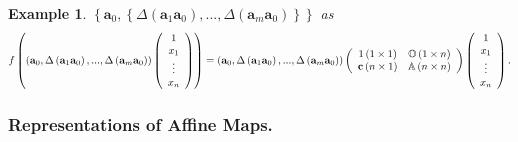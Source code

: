 \documentclass[aps,preprint]{revtex4}%
\newtheorem{example}[theorem]{Example}
\begin{document}
\begin{example}
$\left\{  \mathbf{a}_{0},\left\{  \Delta\left(  \mathbf{a}_{1}\mathbf{a}%
_{0}\right)  ,...,\Delta\left(  \mathbf{a}_{m}\mathbf{a}_{0}\right)  \right\}
\right\}  $ as
\begin{equation}
f\left(  \left(  \mathbf{a}_{0},\Delta\left(  \mathbf{a}_{1}\mathbf{a}%
_{0}\right)  ,...,\Delta\left(  \mathbf{a}_{m}\mathbf{a}_{0}\right)  \right)
\left(
\begin{array}
[c]{c}%
1\\
x_{1}\\
\vdots\\
x_{n}%
\end{array}
\right)  \right)  =\left(  \mathbf{a}_{0},\Delta\left(  \mathbf{a}%
_{1}\mathbf{a}_{0}\right)  ,...,\Delta\left(  \mathbf{a}_{m}\mathbf{a}%
_{0}\right)  \right)  \left(
\begin{array}
[c]{cc}%
1\left(  1\times1\right)  & \mathbb{O}\left(  1\times n\right) \\
\mathbf{c}\left(  n\times1\right)  & \mathbb{A}\left(  n\times n\right)
\end{array}
\right)  \left(
\begin{array}
[c]{c}%
1\\
x_{1}\\
\vdots\\
x_{n}%
\end{array}
\right)  .
\end{equation}

\end{example}

\subsubsection{ Representations of Affine Maps.}
\end{document}
